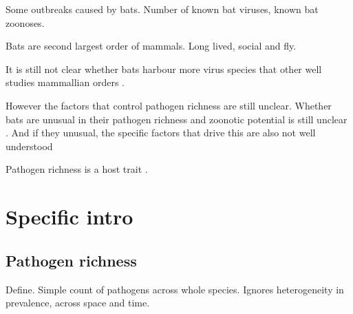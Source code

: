 



Some outbreaks caused by bats.
Number of known bat viruses, known bat zoonoses.

Bats are second largest order of mammals.
Long lived, social and fly.

It is still not clear whether bats harbour more virus species that other well studies mammallian orders \cite{luis2013comparison, olival2015bats}.





However the factors that control pathogen richness are still unclear.
Whether bats are unusual in their pathogen richness and zoonotic potential is still unclear \cite{luis2013comparison, olival2015bats}.
And if they unusual, the specific factors that drive this are also not well understood \cite{luis2013comparison, wang2011mass, o2014bat, dobson2005links}

Pathogen richness is a host trait \cite{bordes2008helminth}.


\section{Specific  intro}
\subsection{Pathogen richness}

Define.
Simple count of pathogens across whole species.
Ignores heterogeneity in prevalence, across space and time.










